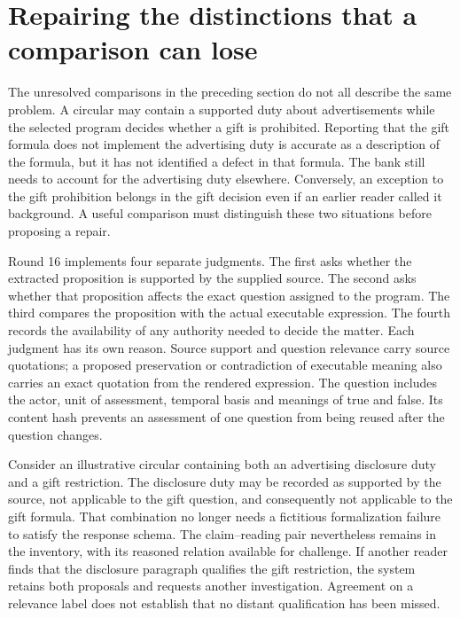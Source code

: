 \section{Repairing the distinctions that a comparison can lose}
\label{sec:input-meaning-repair}

The unresolved comparisons in the preceding section do not all describe the
same problem. A circular may contain a supported duty about advertisements
while the selected program decides whether a gift is prohibited. Reporting
that the gift formula does not implement the advertising duty is accurate as a
description of the formula, but it has not identified a defect in that formula.
The bank still needs to account for the advertising duty elsewhere. Conversely,
an exception to the gift prohibition belongs in the gift decision even if an
earlier reader called it background. A useful comparison must distinguish
these two situations before proposing a repair.

Round 16 implements four separate judgments. The first asks whether the
extracted proposition is supported by the supplied source. The second asks
whether that proposition affects the exact question assigned to the program.
The third compares the proposition with the actual executable expression. The
fourth records the availability of any authority needed to decide the matter.
Each judgment has its own reason. Source support and question relevance carry
source quotations; a proposed preservation or contradiction of executable
meaning also carries an exact quotation from the rendered expression. The
question includes the actor, unit of assessment, temporal basis and meanings
of true and false. Its content hash prevents an assessment of one question
from being reused after the question changes.

Consider an illustrative circular containing both an advertising disclosure
duty and a gift restriction. The disclosure duty may be recorded as supported
by the source, not applicable to the gift question, and consequently not
applicable to the gift formula. That combination no longer needs a fictitious
formalization failure to satisfy the response schema. The claim--reading pair
nevertheless remains in the inventory, with its reasoned relation available for
challenge. If another reader finds that the disclosure paragraph qualifies the
gift restriction, the system retains both proposals and requests another
investigation. Agreement on a relevance label does not establish that no
distant qualification has been missed.

